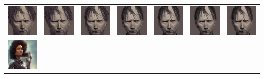 \begin{table}[!htb]
\centering
\begin{tabular}{c c@{}c@{}c@{}c@{}c@{}c}
    \includegraphics[width=0.135\linewidth]{chapter/appendix/def_imgs/yorke/y_0.png} & 
    \includegraphics[width=0.135\linewidth]{chapter/appendix/def_imgs/yorke/y_10.png} &
    \includegraphics[width=0.135\linewidth]{chapter/appendix/def_imgs/yorke/y_20.png} &
    \includegraphics[width=0.135\linewidth]{chapter/appendix/def_imgs/yorke/y_30.png} &
    \includegraphics[width=0.135\linewidth]{chapter/appendix/def_imgs/yorke/y_40.png} &
    \includegraphics[width=0.135\linewidth]{chapter/appendix/def_imgs/yorke/y_50.png} &
    \includegraphics[width=0.135\linewidth]{chapter/appendix/def_imgs/yorke/y_60.png} \\
    \includegraphics[width=0.135\linewidth]{chapter/appendix/def_imgs/woman/w_0.png} & 

\end{tabular}
\end{table}
